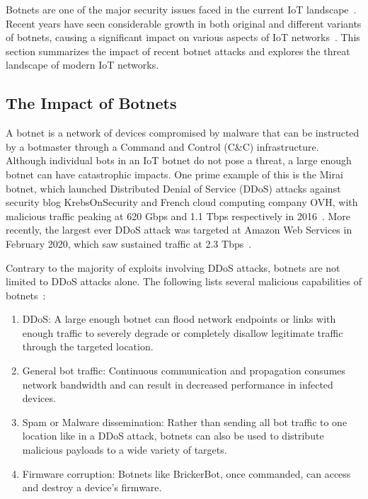 Botnets are one of the major security issues faced in the current IoT landscape~\cite{silva2013_Botnet_Survey}. Recent years have seen considerable growth in both original and different variants of botnets, causing a significant impact on various aspects of IoT networks~\cite{kolias2017_Mirai_DDoS}. This section summarizes the impact of recent botnet attacks and explores the threat landscape of modern IoT networks.
\par

\subsection{The Impact of Botnets}
\label{sub:impact_of_botnets}
A botnet is a network of devices compromised by malware that can be instructed by a botmaster through a Command and Control (C\&C) infrastructure. Although individual bots in an IoT botnet do not pose a threat, a large enough botnet can have catastrophic impacts. One prime example of this is the Mirai botnet, which launched Distributed Denial of Service (DDoS) attacks against security blog KrebsOnSecurity and French cloud computing company OVH, with malicious traffic peaking at 620 Gbps and 1.1 Tbps respectively in 2016~\cite{kolias2017_Mirai_DDoS}. More recently, the largest ever DDoS attack was targeted at Amazon Web Services in February 2020, which saw sustained traffic at 2.3 Tbps~\cite{cloudflare_DDoS}.
\par
Contrary to the majority of exploits involving DDoS attacks, botnets are not limited to DDoS attacks alone. The following lists several malicious capabilities of botnets~\cite{kolias2017_Mirai_DDoS, silva2013_Botnet_Survey}:
\begin{enumerate}
    \item DDoS: A large enough botnet can flood network endpoints or links with enough traffic to severely degrade or completely disallow legitimate traffic through the targeted location.
    \item General bot traffic: Continuous communication and propagation consumes network bandwidth and can result in decreased performance in infected devices.
    \item Spam or Malware dissemination: Rather than sending all bot traffic to one location like in a DDoS attack, botnets can also be used to distribute malicious payloads to a wide variety of targets.
    \item Firmware corruption: Botnets like BrickerBot, once commanded, can access and destroy a device's firmware.
\end{enumerate}


